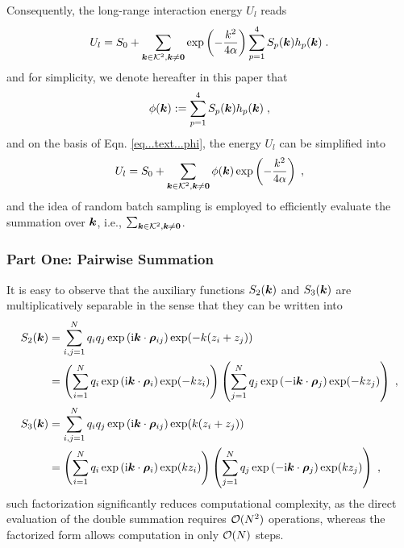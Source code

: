 Consequently, the long-range interaction energy   $U_l$ reads
\begin{equation}\label{eq...text...Energy}
U_l =    S_0+ \sum_{\bm{k}\in\mathcal{K}^2,\bm{k}\neq\bm{0}} \exp\left(-\frac{k^2}{4\alpha}\right)\sum_{p=1}^4S_p(\bm{k})h_p(\bm{k})\;.
\end{equation}
and for simplicity, we denote hereafter in this paper that 
\begin{equation}\label{eq...text...phi}
    \phi(\bm{k}):=\sum_{p=1}^4S_p(\bm{k})h_p(\bm{k})\;,
\end{equation}
and on the basis of Eqn. \eqref{eq...text...phi}, the   energy   $U_l$ can be simplified into 
\begin{equation} \label{eq...text...EnergywithPhi}
U_l =    S_0+ \sum_{\bm{k}\in\mathcal{K}^2,\bm{k}\neq\bm{0}} \phi(\bm{k})\exp\left(-\frac{k^2}{4\alpha}\right) \;,
\end{equation}
and the idea of random batch sampling is employed to efficiently evaluate the summation over   $\bm{k}$, i.e., $\sum_{\bm{k}\in\mathcal{K}^2,\bm{k}\neq\bm{0}}$. 
\subsubsection{Part One: Pairwise Summation}
It is easy to observe that  the  auxiliary functions  $S_2(\bm{k})$ and $S_3(\bm{k})$ are multiplicatively separable  in the sense that  they can be written into
\begin{align*}
S_2(\bm{k})&=\sum_{i,j=1}^Nq_iq_j  \exp{(\mathrm{i} \boldsymbol{k} \cdot \boldsymbol{\rho}_{ij})}\exp(-k(z_i+z_j))\\
&=\left(\sum_{i=1}^Nq_i\exp{(\mathrm{i} \boldsymbol{k} \cdot \boldsymbol{\rho}_{i})}\exp(-kz_i)\right)\left(\sum_{j=1}^Nq_j\exp{(-\mathrm{i} \boldsymbol{k} \cdot \boldsymbol{\rho}_{j})}\exp(-kz_j)\right)\;,\\
S_3(\bm{k})&=\sum_{i,j=1}^Nq_iq_j  \exp{(\mathrm{i} \boldsymbol{k} \cdot \boldsymbol{\rho}_{ij})}\exp(k(z_i+z_j))\\
&=\left(\sum_{i=1}^Nq_i  \exp{(\mathrm{i} \boldsymbol{k} \cdot \boldsymbol{\rho}_{i})}\exp(kz_i)\right)\left(\sum_{j=1}^Nq_j  \exp{(-\mathrm{i} \boldsymbol{k} \cdot \boldsymbol{\rho}_{j})}\exp(kz_j)\right)\;,
\end{align*}
such factorization significantly reduces computational complexity, as the direct evaluation of the double summation requires 
$\mathcal{O}(N^2)$ operations, whereas the factorized form allows computation in only 
$\mathcal{O}(N)$ steps.

